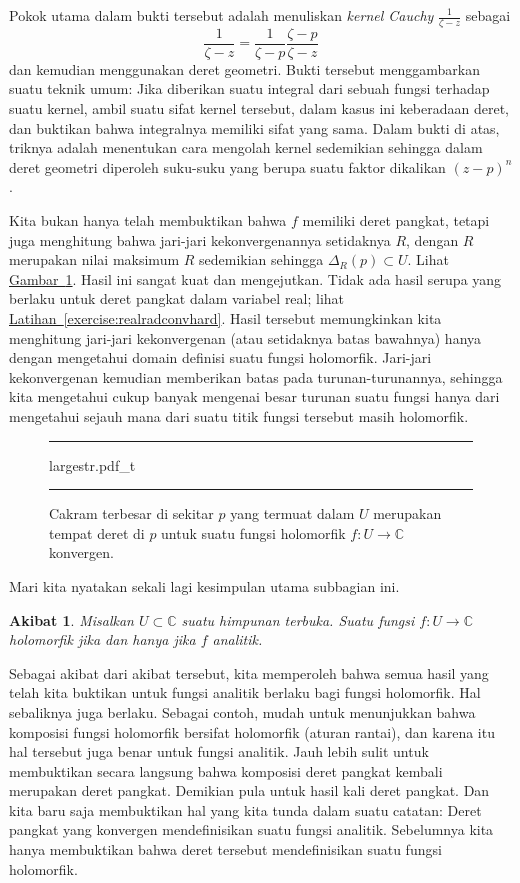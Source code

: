 \documentclass[12pt,openany]{book}
\newcommand{\C}{{\mathbb{C}}}
\newcommand{\myindex}[1]{#1\index{#1}}
\theoremstyle{plain}
\newtheorem{cor}[thm]{Akibat}
\theoremstyle{remark}
\theoremstyle{definition}
\newenvironment{myfig}{%
\begin{figure}[h!t]
\noindent\rule{\textwidth}{0.5pt}\vspace{12pt}\par\centering}%
{\par\noindent\rule{\textwidth}{0.5pt}
\end{figure}}
\theoremstyle{exercise}
\theoremstyle{example}
\newcommand{\figureref}[1]{\hyperref[#1]{Gambar~\ref*{#1}}}
\newcommand{\exerciseref}[1]{\hyperref[#1]{Latihan~\ref*{#1}}}
\begin{document}
Pokok utama dalam bukti tersebut adalah menuliskan \emph{\myindex{kernel Cauchy}}
$\frac{1}{\zeta-z}$ sebagai
\begin{equation*}
\frac{1}{\zeta-z}
=
\frac{1}{\zeta-p}
\frac{\zeta-p}{\zeta-z}
\end{equation*}
dan kemudian menggunakan deret geometri.
Bukti tersebut menggambarkan suatu teknik umum:
Jika diberikan suatu
integral dari sebuah fungsi terhadap suatu kernel,
ambil suatu sifat kernel tersebut, dalam kasus ini keberadaan deret, dan buktikan bahwa
integralnya memiliki sifat yang sama.  Dalam bukti di atas, triknya adalah menentukan
cara mengolah kernel sedemikian sehingga dalam deret geometri diperoleh suku-suku
yang berupa suatu faktor dikalikan ${(z-p)}^n$.

Kita bukan hanya telah membuktikan
bahwa $f$ memiliki deret pangkat, tetapi juga menghitung
bahwa jari-jari kekonvergenannya setidaknya $R$, dengan $R$ merupakan nilai maksimum $R$
sedemikian sehingga $\Delta_R(p) \subset U$.  Lihat \figureref{fig:largestr}.
Hasil ini sangat kuat dan mengejutkan.
Tidak ada hasil serupa yang berlaku untuk deret pangkat dalam variabel real;
lihat \exerciseref{exercise:realradconvhard}.
Hasil tersebut memungkinkan kita menghitung jari-jari kekonvergenan (atau setidaknya batas bawahnya)
hanya dengan mengetahui 
domain definisi suatu fungsi holomorfik.  Jari-jari kekonvergenan
kemudian memberikan batas pada turunan-turunannya, sehingga kita mengetahui cukup banyak mengenai
besar turunan suatu fungsi hanya dari mengetahui sejauh mana dari suatu titik fungsi tersebut
masih holomorfik.

\begin{myfig}
{largestr.pdf_t}
\caption{Cakram terbesar di sekitar $p$ yang termuat dalam $U$
merupakan tempat deret di $p$
untuk suatu fungsi holomorfik $f \colon U \to \C$ konvergen.%
\label{fig:largestr}}
\end{myfig}

Mari kita nyatakan sekali lagi kesimpulan utama subbagian ini.

\begin{cor}
Misalkan $U \subset \C$ suatu himpunan terbuka.  Suatu fungsi $f \colon U \to \C$
holomorfik jika dan hanya jika $f$ analitik.
\end{cor}

Sebagai akibat dari akibat tersebut, kita memperoleh bahwa semua hasil yang telah kita buktikan
untuk fungsi analitik berlaku bagi fungsi holomorfik.  Hal sebaliknya juga berlaku.  Sebagai contoh, mudah untuk menunjukkan bahwa komposisi
fungsi holomorfik bersifat holomorfik (aturan rantai), dan
karena itu hal tersebut juga benar untuk fungsi analitik.
Jauh lebih sulit untuk membuktikan secara langsung bahwa komposisi deret pangkat
kembali merupakan deret pangkat.
Demikian pula untuk hasil kali deret pangkat.
Dan kita baru saja membuktikan hal yang kita tunda dalam suatu catatan: Deret pangkat yang konvergen
mendefinisikan suatu fungsi analitik.  Sebelumnya kita hanya membuktikan bahwa deret tersebut mendefinisikan
suatu fungsi holomorfik.
\end{document}
